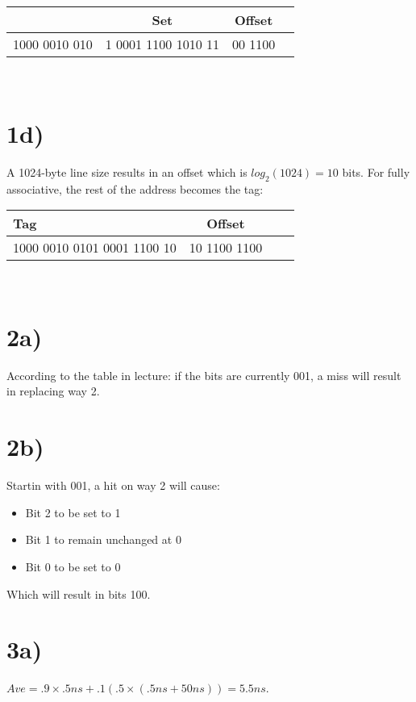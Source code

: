 \documentclass[a4paper,11pt]{article}
\begin{document}
\begin{tabular}{| l | c | c | c |}
  \hline	
      & Set & Offset  \\  \hline \hline
      1000 0010  010 & 1 0001 1100 1010 11 & 00 1100 \\ \hline
\end{tabular} \\

\section*{1d)}
A 1024-byte line size results in an offset which is $log_2(1024) = 10$ bits.  For fully associative, the rest of the address becomes the tag:

\begin{tabular}{| l | c | c | c |}
  \hline	
      Tag & Offset  \\  \hline \hline
      1000 0010  0101 0001 1100 10 & 10 1100 1100 \\ \hline
\end{tabular} \\



\section*{2a)} 
According to the table in lecture: if the bits are currently 001, a miss will result in replacing way 2.

\section*{2b)} 
Startin with 001, a hit on way 2 will cause:

\begin{itemize}
  \item Bit 2 to be set to 1
  \item Bit 1 to remain unchanged at 0
  \item Bit 0 to be set to 0
\end{itemize}

\noindent Which will result in bits 100.



\section*{3a)}
$ Ave = .9 \times .5ns + .1 (.5 \times (.5ns + 50ns)) = 5.5 ns$.
 
\end{document}
